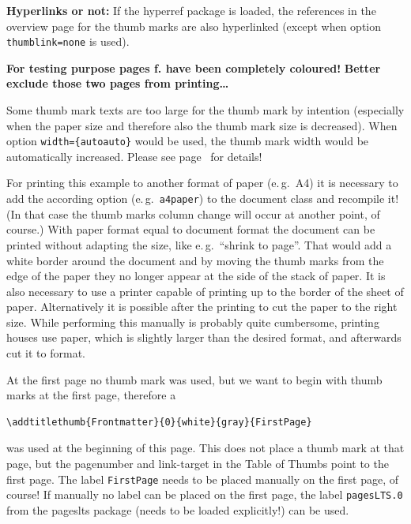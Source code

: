 \documentclass[a4paper,twoside,british]{article}[2025/01/22]%
\begin{document}
\textbf{Hyperlinks or not:} If the \textsf{hyperref} package is loaded,
the references in the overview page for the thumb marks are also hyperlinked
(except when option \texttt{thumblink=none} is used).\bigskip

\noindent\textbf{For testing purpose pages \pageref{greenpage}f. have been completely coloured!}\newline
\textbf{Better exclude those two pages from printing\ldots}\bigskip

Some thumb mark texts are too large for the thumb mark by intention
(especially when the paper size and therefore also the thumb mark size
is decreased). When option \texttt{width=\{autoauto\}} would be used,
the thumb mark width would be automatically increased.
Please see page~\pageref{HugeText} for details!\bigskip

For printing this example to another format of paper (e.\,g.~A4) it is necessary to add the according
option (e.\,g.~\verb|a4paper|) to the document class and recompile it! (In that case the
thumb marks column change will occur at another point, of course.)
With paper format equal to document format the document can be printed without adapting the size,
like e.\,g.~\textquotedblleft shrink to page\textquotedblright . That would add a white border around
the document and by moving the thumb marks from the edge of the paper they no longer appear
at the side of the stack of paper. It is also necessary to use a printer capable of printing up to the
border of the sheet of paper. Alternatively it is possible after the printing to cut the paper to the
right size. While performing this manually is probably quite cumbersome, printing houses use paper,
which is slightly larger than the desired format, and afterwards cut it to format.
\newpage


At the first page no thumb mark was used, but we want to begin with thumb marks
at the first page, therefore a
\begin{verbatim}
\addtitlethumb{Frontmatter}{0}{white}{gray}{FirstPage}
\end{verbatim}
was used at the beginning of this page. This does not place a thumb mark at that page,
but the pagenumber and link{-}target in the Table of Thumbs point to the first page.
The label \verb|FirstPage| needs to be placed manually on the first page, of course!
If manually no label can be placed on the first page, the label \texttt{pagesLTS.0}
from the \textsf{pageslts} package (needs to be loaded explicitly!) can be used.
\newpage
\tableofcontents
\newpage
\end{document}
